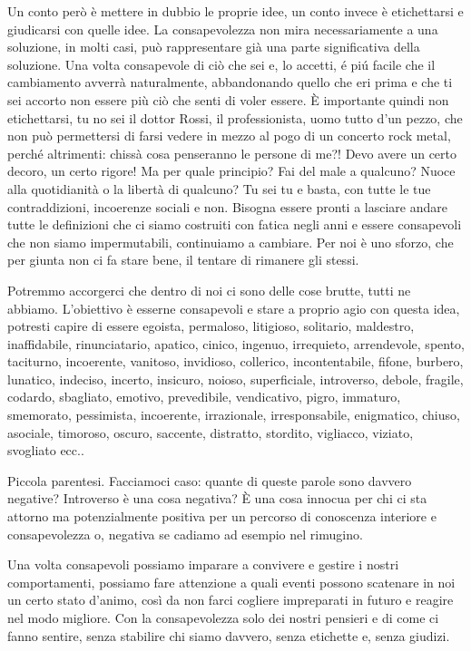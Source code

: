 \documentclass[12pt]{book} %
\begin{document}
Un conto però è mettere in dubbio le proprie idee, un conto invece è etichettarsi e giudicarsi con quelle idee. La
consapevolezza non mira necessariamente a una soluzione, in molti casi, può rappresentare già una parte significativa della soluzione. Una volta consapevole di ciò che sei e, lo accetti, é piú facile che il cambiamento avverrà
naturalmente, abbandonando quello che eri prima e che ti sei accorto non essere più ciò che senti di voler essere. È importante quindi non
etichettarsi, tu no sei il dottor Rossi, il professionista, uomo tutto d'un pezzo, che non può
permettersi di farsi vedere in mezzo al pogo di un concerto rock metal, perché altrimenti: chissà cosa penseranno le
persone di me?! Devo avere un certo decoro, un certo rigore! Ma per quale principio? Fai del male a qualcuno? Nuoce
alla quotidianità o la libertà di qualcuno? Tu sei tu e basta, con tutte le tue contraddizioni, incoerenze sociali e
non. Bisogna essere pronti a lasciare andare tutte le definizioni che ci siamo costruiti con fatica negli anni e essere
consapevoli che non siamo impermutabili, continuiamo a cambiare. Per noi è uno sforzo, che per giunta non ci fa stare
bene, il tentare di rimanere gli stessi.

Potremmo accorgerci che dentro di noi ci sono delle cose brutte, tutti ne abbiamo. L'obiettivo è
esserne consapevoli e stare a proprio agio con questa idea, potresti capire di essere egoista, permaloso, litigioso,
solitario, maldestro, inaffidabile, rinunciatario, apatico, cinico, ingenuo, irrequieto, arrendevole, spento,
taciturno, incoerente, vanitoso, invidioso, collerico, incontentabile, fifone, burbero, lunatico, indeciso, incerto,
insicuro, noioso, superficiale, introverso, debole, fragile, codardo, sbagliato, emotivo, prevedibile, vendicativo,
pigro, immaturo, smemorato, pessimista, incoerente, irrazionale, irresponsabile, enigmatico, chiuso, asociale,
timoroso, oscuro, saccente, distratto, stordito, vigliacco, viziato, svogliato ecc..

Piccola parentesi. Facciamoci caso: quante di queste parole sono davvero negative? Introverso è una cosa negativa? È una cosa innocua per chi ci sta attorno ma potenzialmente positiva per un percorso di conoscenza interiore e consapevolezza o, negativa se cadiamo ad esempio nel rimugino.

Una volta consapevoli possiamo imparare a convivere e gestire i nostri comportamenti, possiamo fare attenzione a quali
eventi possono scatenare in noi un certo stato d'animo, così da non farci cogliere impreparati in
futuro e reagire nel modo migliore. Con la consapevolezza solo dei nostri pensieri e di come ci fanno sentire, senza
stabilire chi siamo davvero, senza etichette e, senza giudizi. 
\end{document}
